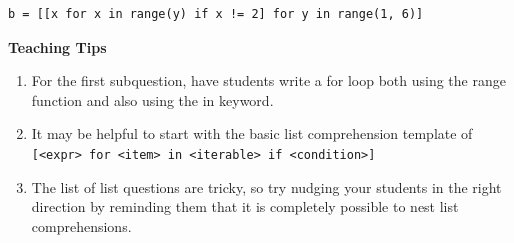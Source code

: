 \begin{blocksection}
\begin{parts}
\begin{solution}[0.5in]
\begin{lstlisting}
b = [[x for x in range(y) if x != 2] for y in range(1, 6)]
\end{lstlisting}
\end{solution}
\end{parts}


\begin{questionmeta}
    \textbf{Teaching Tips}
    \begin{enumerate}
            \item For the first subquestion, have students write a for loop both using the range function and also using the in keyword.
            \item It may be helpful to start with the basic list comprehension template of \texttt{[<expr> for <item> in <iterable> if <condition>]}
            \item The list of list questions are tricky, so try nudging your students in the right direction by reminding them that it is completely possible to nest list comprehensions.
    \end{enumerate}
\end{questionmeta}
\end{blocksection}

